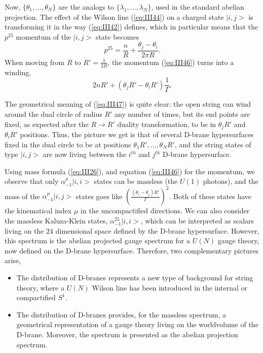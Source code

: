 Now, $\{\theta_1,\ldots,\theta_N\}$ are the analogs to
$\{\lambda_1,\ldots,\lambda_N\}$, used in the standard abelian
projection. The effect of the Wilson line (\ref{eq:III44}) on a
charged state $|i,j>$ is transforming it in the way
(\ref{eq:III42}) defines, which in particular means that the
$p^{25}$ momentum of the $|i,j>$ state becomes
\begin{equation}
p^{25} = \frac {n}{R} + \frac {\theta_j-\theta_i}{2\pi R}.
\label{eq:III46}
\end{equation}
When moving from $R$ to $R'=\frac {1}{2R}$, the momentum
(\ref{eq:III46}) turns into a winding,
\begin{equation}
2 n R' + (\theta_j R' - \theta_i R') \frac {1}{\Gamma}.
\label{eq:III47}
\end{equation}
  
The geometrical meaning of (\ref{eq:III47}) is quite clear: the
open string can wind around the dual circle of radius $R'$ any
number of times, but its end points are fixed, as expected after
the $R \rightarrow R'$ duality transformation, to be in $\theta_j
R'$ and $\theta_i R'$ positions. Thus, the picture we get is that
of several D-brane hypersurfaces fixed in the dual circle to be
at positions $\theta_1 R', \ldots,\theta_N R'$, and the string
states of type $|i,j>$ are now living between the $i^{th}$ and $j^{th}$
D-brane hypersurface.
  
Using mass formula (\ref{eq:III26}), and equation
(\ref{eq:III46}) for the momentum, we observe that only
$\alpha_{-1}^{\mu} |i,i>$ states can be massless (the $U(1)$
photons), and the mass of the $\alpha_{-1}^{\mu} |i,j>$ states
goes like $\left( \frac {(\theta_i-\theta_j)R'}{\Gamma}
\right)^2$. Both of these states have the kinematical index $\mu$
in the uncompactified directions. We can also consider the
massless Kaluza-Klein states, $\alpha_{-1}^{25} |i,i>$, which can
be interpreted as scalars living on the $24$ dimensional space
defined by the D-brane hypersurface. However, this spectrum is
the abelian projected gauge spectrum for a $U(N)$ gauge theory,
now defined on the D-brane hypersurface. Therefore, two
complementary pictures arise,
\begin{itemize}
	\item The distribution of D-branes represents a new type
of background for string theory, where a $U(N)$ Wilson line has
been introduced in the internal or compactified $S^1$.
	\item The distribution of D-branes provides, for the
massless spectrum, a geometrical representation of a gauge theory
living on the worldvolume of the D-brane. Moreover, the spectrum
is presented as the abelian projection spectrum.
\end{itemize}
  
